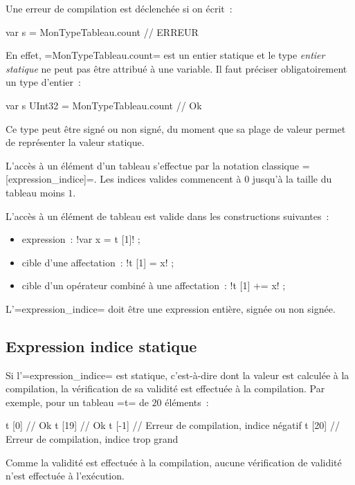 Une erreur de compilation est déclenchée si on écrit~:
\begin{PLM}
var s = MonTypeTableau.count // ERREUR
\end{PLM}

En effet, \plm=MonTypeTableau.count= est un entier statique et le type \emph{entier statique} ne peut pas être attribué à une variable. Il faut préciser obligatoirement un type d'entier~:

\begin{PLM}
var s UInt32 = MonTypeTableau.count // Ok
\end{PLM}

Ce type peut être signé ou non signé, du moment que sa plage de valeur permet de représenter la valeur statique.







L'accès à un élément d'un tableau s'effectue par la notation classique \plm=[expression_indice]=. Les indices valides commencent à $0$ jusqu'à la taille du tableau moins $1$.

L'accès à un élément de tableau est valide dans les constructions suivantes~:
\begin{itemize}
  \item expression~: \plm!var x = t [1]! ;
  \item cible d'une affectation~: \plm!t [1] = x! ;
  \item cible d'un opérateur combiné à une affectation~: \plm!t [1] += x! ;
\end{itemize}

L'\plm=expression_indice= doit être une expression entière, signée ou non signée.

\subsection{Expression indice statique}

Si l'\plm=expression_indice= est statique, c'est-à-dire dont la valeur est calculée à la compilation, la vérification de sa validité est effectuée à la compilation. Par exemple, pour un tableau \plm=t= de $20$ éléments~:
\begin{PLM}
t [0] // Ok
t [19] // Ok
t [-1] // Erreur de compilation, indice négatif
t [20] // Erreur de compilation, indice trop grand
\end{PLM}

Comme la validité est effectuée à la compilation, aucune vérification de validité n'est effectuée à l'exécution.


